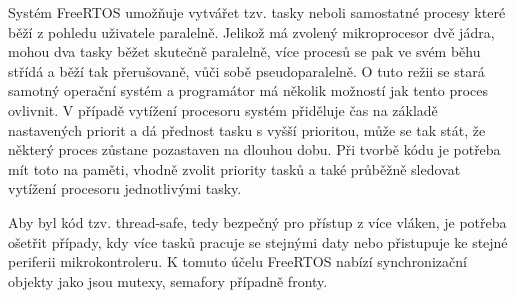         Systém FreeRTOS umožňuje vytvářet tzv. tasky neboli samostatné procesy které běží z pohledu uživatele paralelně. Jelikož má zvolený mikroprocesor dvě jádra, mohou dva tasky běžet skutečně paralelně, více procesů se pak ve svém běhu střídá a běží tak přerušovaně, vůči sobě pseudoparalelně. O tuto režii se stará samotný operační systém a programátor má několik možností jak tento proces ovlivnit. V případě vytížení procesoru systém přiděluje čas na základě nastavených priorit a dá přednost tasku s vyšší prioritou, může se tak stát, že některý proces zůstane pozastaven na dlouhou dobu. Při tvorbě kódu je potřeba mít toto na paměti, vhodně zvolit priority tasků a také průběžně sledovat vytížení procesoru jednotlivými tasky.  

        Aby byl kód tzv. thread-safe, tedy bezpečný pro přístup z více vláken, je potřeba ošetřit případy, kdy více tasků pracuje se stejnými daty nebo přistupuje ke stejné periferii mikrokontroleru. K tomuto účelu FreeRTOS nabízí synchronizační objekty jako jsou mutexy, semafory případně fronty. 

